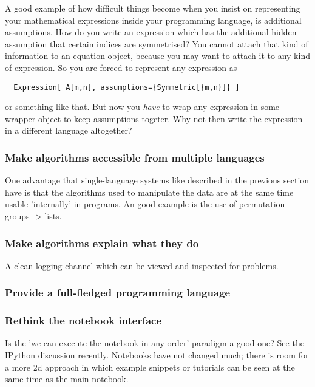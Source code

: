 \documentclass[11pt]{article}
\begin{document}
A good example of how difficult things become when you insist on 
representing your mathematical expressions inside your programming language,
is additional assumptions. How do you write an expression which has the
additional hidden assumption that certain indices are symmetrised? 
You cannot attach that kind of information to an equation object, because you may 
want to attach it to any kind of expression. So you are forced to represent
any expression as
\begin{verbatim}
  Expression[ A[m,n], assumptions={Symmetric[{m,n}]} ]
\end{verbatim}
or something like that. But now you \emph{have} to wrap any expression
in some wrapper object to keep assumptions togeter. Why not then write
the expression in a different language altogether?

\subsubsection{Make algorithms accessible from multiple languages}

One advantage that single-language systems like described in the
previous section have is that the algorithms used to manipulate the
data are at the same time usable 'internally' in programs. An good
example is the use of permutation groups -> lists.

\subsubsection{Make algorithms explain what they do}

A clean logging channel which can be viewed and inspected for problems.


\subsubsection{Provide a full-fledged programming language}



\subsubsection{Rethink the notebook interface}

Is the 'we can execute the notebook in any order' paradigm a good one?
See the IPython discussion recently. Notebooks have not changed much;
there is room for a more 2d approach in which example snippets or
tutorials can be seen at the same time as the main notebook.
\end{document}
